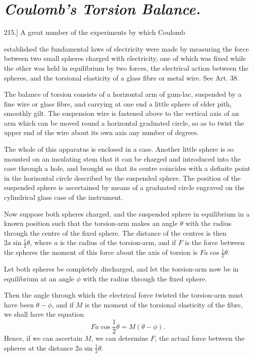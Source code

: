 \documentclass[11pt,a4paper]{article}
\begin{document}
\section*{\textit{Coulomb's Torsion Balance.}}

215.] A great number of the experiments by which Coulomb

\clearpage

established the fundamental laws of electricity were made by measuring
the force between two small spheres charged with electricity, one of
which was fixed while the other was held in equilibrium by two forces,
the electrical action between the spheres, and the torsional elasticity
of a glass fibre or metal wire. See Art. 38.

The balance of torsion consists of a horizontal arm of gum-lac,
suspended by a fine wire or glass fibre, and carrying at one end a
little sphere of elder pith, smoothly gilt. The suspension wire is
fastened above to the vertical axis of an arm which can be moved
round a horizontal graduated circle, so as to twist the upper end
of the wire about its own axis any number of degrees.

The whole of this apparatus is enclosed in a case. Another little
sphere is so mounted on an insulating stem that it can be charged
and introduced into the case through a hole, and brought so that
its centre coincides with a definite point in the horizontal circle
described by the suspended sphere. The position of the suspended
sphere is ascertained by means of a graduated circle engraved on
the cylindrical glass case of the instrument.

Now suppose both spheres charged, and the suspended sphere
in equilibrium in a known position such that the torsion-arm makes
an angle $\theta$ with the radius through the centre of the fixed sphere.
The distance of the centres is then $2a\sin\frac{1}{2}\theta$, where $a$
is the radius of the torsion-arm, and if $F$ is the force between the
spheres the moment of this force about the axis of torsion is
$Fa\cos\frac{1}{2}\theta$.

Let both spheres be completely discharged, and let the torsion-arm
now be in equilibrium at an angle $\phi$ with the radius through
the fixed sphere.

Then the angle through which the electrical force twisted the
torsion-arm must have been $\theta-\phi$, and if $M$ is the moment of
the torsional elasticity of the fibre, we shall have the equation
\[
Fa\cos\frac{1}{2}\theta = M(\theta-\phi).
\]
Hence, if we can ascertain $M$, we can determine $F$, the actual
force between the spheres at the distance $2a\sin\frac{1}{2}\theta$.
\end{document}

